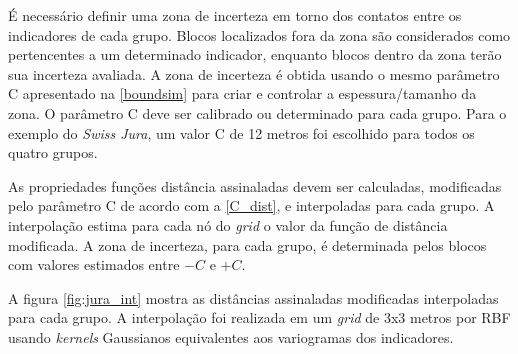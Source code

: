 É necessário definir uma zona de incerteza em torno dos contatos entre os indicadores de cada grupo. Blocos localizados fora da zona são considerados como pertencentes a um determinado indicador, enquanto blocos dentro da zona terão sua incerteza avaliada. A zona de incerteza é obtida usando o mesmo parâmetro C apresentado na \autoref{boundsim} para criar e controlar a espessura/tamanho da zona. O parâmetro C deve ser calibrado ou determinado para cada grupo. Para o exemplo do \textit{Swiss Jura}, um valor C de 12 metros foi escolhido para todos os quatro grupos.

As propriedades funções distância assinaladas devem ser calculadas, modificadas pelo parâmetro C de acordo com a \autoref{C_dist}, e interpoladas para cada grupo. A interpolação estima para cada nó do \textit{grid} o valor da função de distância modificada. A zona de incerteza, para cada grupo, é determinada pelos blocos com valores estimados entre $ -C $ e $ + C $.

A figura \autoref{fig:jura_int} mostra as distâncias assinaladas modificadas interpoladas para cada grupo. A interpolação foi realizada em um \textit{grid} de 3x3 metros por RBF usando \textit{kernels} Gaussianos equivalentes aos variogramas dos indicadores.

